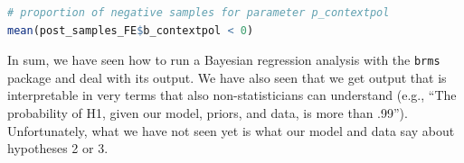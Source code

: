 \documentclass[nobib]{tufte-handout}
\begin{document}
\begin{minipage}[]{\textwidth}
\begin{lstlisting}[language=R]
# proportion of negative samples for parameter p_contextpol
mean(post_samples_FE$b_contextpol < 0)
\end{lstlisting}
\end{minipage}

In sum, we have seen how to run a Bayesian regression analysis with the \texttt{brms} package and deal with its output. We have also seen that we get output that is interpretable in very terms that also non-statisticians can understand (e.g., ``The probability of H1, given our model, priors, and data, is more than .99''). Unfortunately, what we have not seen yet is what our model and data say about hypotheses 2 or 3.







\bigskip


\end{document}
